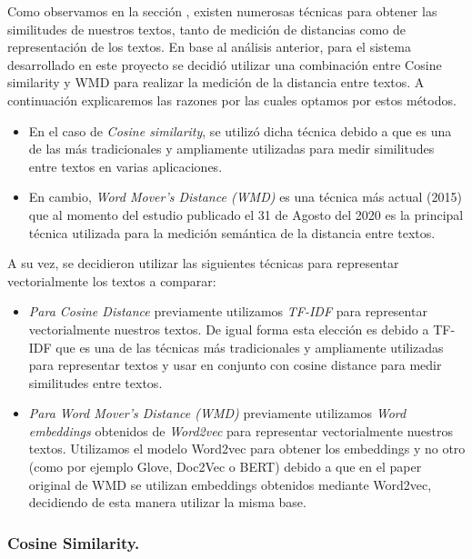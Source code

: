 \documentclass[12pt,a4paper]{article}
\begin{document}
\begin{sloppypar}
Como observamos en la sección \textit{}, existen numerosas técnicas para obtener las similitudes de nuestros textos, tanto de medición de distancias como de representación de los textos. En base al análisis anterior, para el sistema desarrollado en este proyecto se decidió utilizar una combinación entre Cosine similarity y WMD para realizar la medición de la distancia entre textos. A continuación explicaremos las razones por las cuales optamos por estos métodos.
\begin{itemize}
\item En el caso de \textit{Cosine similarity}, se utilizó dicha técnica debido a que es una de las más tradicionales y ampliamente utilizadas para medir similitudes entre textos en varias aplicaciones\cite{similarity_survey, cosine_sim_1, cosine_sim_2, cosine_sim_3}.
\item En cambio, \textit{Word Mover’s Distance (WMD)} es una técnica más actual (2015)\cite{wmd_paper} que al momento del estudio publicado el 31 de Agosto del 2020\cite{similarity_survey} es la principal técnica utilizada para la medición semántica de la distancia entre textos.
\end{itemize}

A su vez, se decidieron utilizar las siguientes técnicas para representar vectorialmente los textos a comparar:
\begin{itemize}
\item \textit{Para Cosine Distance} previamente utilizamos \textit{TF-IDF} para representar vectorialmente nuestros textos. De igual forma esta elección es debido a TF-IDF que es una de las técnicas más tradicionales y ampliamente utilizadas para representar textos y usar en conjunto con cosine distance para medir similitudes entre textos\cite{similarity_survey}. 
\item \textit{Para Word Mover’s Distance (WMD)} previamente utilizamos \textit{Word embeddings} obtenidos de \textit{Word2vec} para representar vectorialmente nuestros textos. Utilizamos el modelo Word2vec para obtener los embeddings y no otro (como por ejemplo Glove, Doc2Vec o BERT)  debido a que en el paper original de WMD\cite{wmd_paper} se utilizan embeddings obtenidos mediante Word2vec, decidiendo de esta manera utilizar la misma base.
\end{itemize}

\cleardoublepage

\subsubsection{Cosine Similarity.}\label{cosine}


\end{sloppypar}
\end{document}
